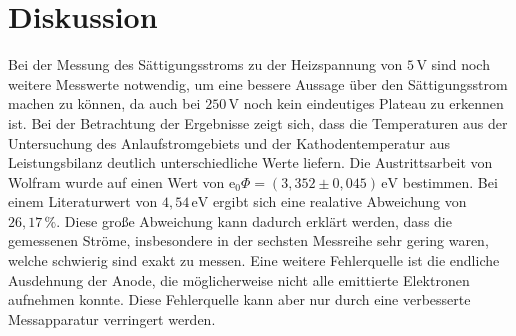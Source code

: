 \section{Diskussion}
\label{sec:Diskussion}

Bei der Messung des Sättigungsstroms zu der Heizspannung von $5 \, \unit{\volt}$ sind noch weitere Messwerte notwendig, um eine bessere Aussage über den Sättigungsstrom machen zu können, da auch bei $250 \, \unit{\volt}$ noch kein eindeutiges Plateau zu erkennen ist.
Bei der Betrachtung der Ergebnisse zeigt sich, dass die Temperaturen aus der Untersuchung des Anlaufstromgebiets und der Kathodentemperatur aus Leistungsbilanz deutlich unterschiedliche Werte liefern.
Die Austrittsarbeit von Wolfram wurde auf einen Wert von $\text{e}_0 \Phi = (3,352 \pm 0,045) \,\unit{\eV}$ bestimmen. Bei einem Literaturwert von $4,54 \, \unit{\electronvolt}$ \cite{ap10} ergibt sich eine realative Abweichung von $ 26,17 \, \%$.
Diese große Abweichung kann dadurch erklärt werden, dass die gemessenen Ströme, insbesondere in der sechsten Messreihe sehr gering waren, welche schwierig sind exakt zu messen.
Eine weitere Fehlerquelle ist die endliche Ausdehnung der Anode, die möglicherweise nicht alle emittierte Elektronen aufnehmen konnte. Diese Fehlerquelle kann aber nur durch eine verbesserte Messapparatur verringert werden.